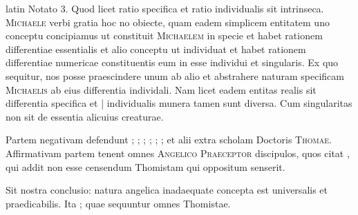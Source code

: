 \begin{otherlanguage*}{latin}
\pstart
 Notato 3. Quod licet ratio specifica et ratio individualis sit intrinseca. \textsc{Michaele}\index[persons]{} verbi gratia hoc no obiecte, quam eadem simplicem entitatem uno conceptu concipiamus ut constituit \textsc{Michaelem}\index[persons]{} in specie et habet rationem differentiae essentialis et alio conceptu ut individuat et habet rationem differentiae numericae constituentis eum in esse individui et singularis. Ex quo sequitur, nos posse praescindere unum ab alio et abstrahere naturam specificam \textsc{Michaelis}\index[persons]{} ab eius differentia individali. Nam licet eadem entitas realis sit differentia specifica et \textnormal{|} individualis munera tamen sunt diversa. Cum singularitas non sit de essentia alicuius creaturae. 
\pend

\pstart
 Partem negativam defendunt ; ; ; ; ; ;  et alii extra scholam Doctoris \textsc{Thomae}. Affirmativam partem tenent omnes \textsc{Angelico Praeceptor} discipulos, quos citat , qui addit non esse censendum Thomistam qui oppositum senserit. 
\pend

\pstart
 Sit nostra conclusio: natura angelica inadaequate concepta est universalis et praedicabilis. Ita ; quae sequuntur omnes Thomistae. 
\pend


\end{otherlanguage*}
